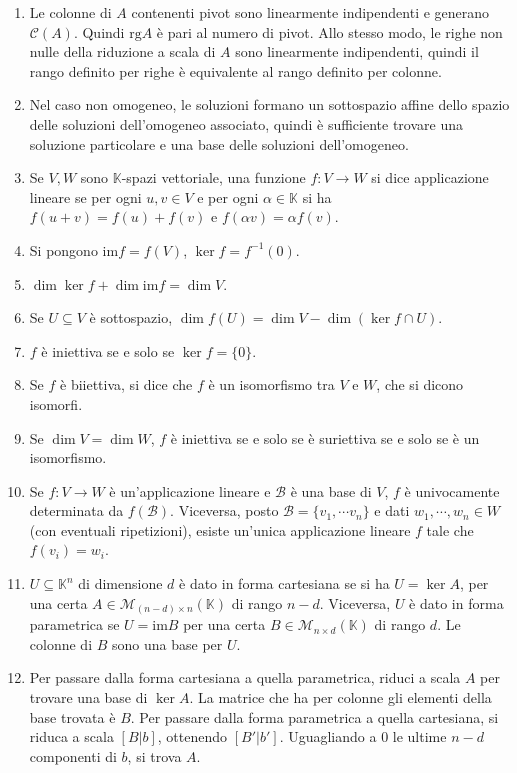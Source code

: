 \documentclass[a4paper,11pt]{article}
\newcommand{\base}[1]{\mathcal{#1}}				%
\newcommand{\rg}{\mathrm{rg}}						%
\newcommand{\imm}{\mathrm{im}}						%
\begin{document}
\begin{enumerate}[resume]
	\item Le colonne di $A$ contenenti pivot sono linearmente indipendenti e generano $\mathcal{C}(A)$. Quindi $\rg A$ è pari al numero di pivot. Allo stesso modo, le righe non nulle della riduzione a scala di $A$ sono linearmente indipendenti, quindi il rango definito per righe è equivalente al rango definito per colonne.
	\item Nel caso non omogeneo, le soluzioni formano un sottospazio affine dello spazio delle soluzioni dell'omogeneo associato, quindi è sufficiente trovare una soluzione particolare e una base delle soluzioni dell'omogeneo.
	\item Se $V,W$ sono $\mathbb{K}$-spazi vettoriale, una funzione $f\colon V\to W$ si dice applicazione lineare se per ogni $u,v\in V$ e per ogni $\alpha\in\mathbb{K}$ si ha $f(u+v)=f(u)+f(v)$ e $f(\alpha v)=\alpha f(v)$.
	\item Si pongono $\imm f=f(V)$, $\ker f=f^{-1}(0)$.
	\item $\dim\ker f+\dim\imm f=\dim V$.
	\item Se $U\subseteq V$ è sottospazio, $\dim f(U)=\dim V-\dim(\ker f\cap U)$.
	\item $f$ è iniettiva se e solo se $\ker f=\{0\}$.
	\item Se $f$ è biiettiva, si dice che $f$ è un isomorfismo tra $V$ e $W$, che si dicono isomorfi.
	\item Se $\dim V=\dim W$, $f$ è iniettiva se e solo se è suriettiva se e solo se è un isomorfismo.
	\item Se $f\colon V\to W$ è un'applicazione lineare e $\base{B}$ è una base di $V$, $f$ è univocamente determinata da $f(\base{B})$. Viceversa, posto $\base{B}=\{v_1,\cdots v_n\}$ e dati $w_1,\cdots,w_n\in W$ (con eventuali ripetizioni), esiste un'unica applicazione lineare $f$ tale che $f(v_i)=w_i$.
	\item $U\subseteq \mathbb{K}^n$ di dimensione $d$ è dato in forma cartesiana se si ha $U=\ker A$, per una certa $A\in\mathcal{M}_{(n-d)\times n}(\mathbb{K})$ di rango $n-d$. Viceversa, $U$ è dato in forma parametrica se $U=\imm B$ per una certa $B\in\mathcal{M}_{n\times d}(\mathbb{K})$ di rango $d$. Le colonne di $B$ sono una base per $U$.
	\item Per passare dalla forma cartesiana a quella parametrica, riduci a scala $A$ per trovare una base di $\ker A$. La matrice che ha per colonne gli elementi della base trovata è $B$. Per passare dalla forma parametrica a quella cartesiana, si riduca a scala $[B|b]$, ottenendo $[B'|b']$. Uguagliando a 0 le ultime $n-d$ componenti di $b$, si trova $A$.

\end{enumerate}
\end{document}
